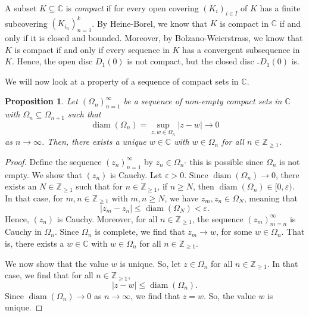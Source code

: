 \documentclass[a4paper, openany]{memoir}
\theoremstyle{definition}
\theoremstyle{plain}
\newtheorem{proposition}[definition]{Proposition}
\begin{document}
    A subset $K \subseteq \mathbb{C}$ is \emph{compact} if for every open covering $(K_i)_{i \in I}$ of $K$ has a finite subcovering $(K_{i_n})_{n=1}^k$. By Heine-Borel, we know that $K$ is compact in $\mathbb{C}$ if and only if it is closed and bounded. Moreover, by Bolzano-Weierstrass, we know that $K$ is compact if and only if every sequence in $K$ has a convergent subsequence in $K$. Hence, the open disc $D_1(0)$ is not compact, but the closed disc $\overline{}{D}_1(0)$ is.

    We will now look at a property of a sequence of compact sets in $\mathbb{C}$.
    \begin{proposition}
        Let $(\Omega_n)_{n=1}^\infty$ be a sequence of non-empty compact sets in $\mathbb{C}$ with $\Omega_n \subseteq \Omega_{n+1}$ such that 
        \[\operatorname{diam}(\Omega_n) = \sup_{z, w \in \Omega_n} |z - w| \to 0\]
        as $n \to \infty$. Then, there exists a unique $w \in \mathbb{C}$ with $w \in \Omega_n$ for all $n \in \mathbb{Z}_{\geq 1}$.
    \end{proposition}
    \begin{proof}
        Define the sequence $(z_n)_{n=1}^\infty$ by $z_n \in \Omega_n$- this is possible since $\Omega_n$ is not empty. We show that $(z_n)$ is Cauchy. Let $\varepsilon > 0$. Since $\operatorname{diam}(\Omega_n) \to 0$, there exists an $N \in \mathbb{Z}_{\geq 1}$ such that for $n \in \mathbb{Z}_{\geq 1}$, if $n \geq N$, then $\operatorname{diam}(\Omega_n) \in [0, \varepsilon)$. In that case, for $m, n \in \mathbb{Z}_{\geq 1}$ with $m, n \geq N$, we have $z_m, z_n \in \Omega_N$, meaning that
        \[|z_m - z_n| \leq \operatorname{diam}(\Omega_N) < \varepsilon.\]
        Hence, $(z_n)$ is Cauchy. Moreover, for all $n \in \mathbb{Z}_{\geq 1}$, the sequence $(z_m)_{m=n}^\infty$ is Cauchy in $\Omega_n$. Since $\Omega_n$ is complete, we find that $z_m \to w$, for some $w \in \Omega_n$. That is, there exists a $w \in \mathbb{C}$ with $w \in \Omega_n$ for all $n \in \mathbb{Z}_{\geq 1}$.

        We now show that the value $w$ is unique. So, let $z \in \Omega_n$ for all $n \in \mathbb{Z}_{\geq 1}$. In that case, we find that for all $n \in \mathbb{Z}_{\geq 1}$,
        \[|z - w| \leq \operatorname{diam}(\Omega_n).\]
        Since $\operatorname{diam}(\Omega_n) \to 0$ as $n \to \infty$, we find that $z = w$. So, the value $w$ is unique.
    \end{proof}
    \newpage
\end{document}

